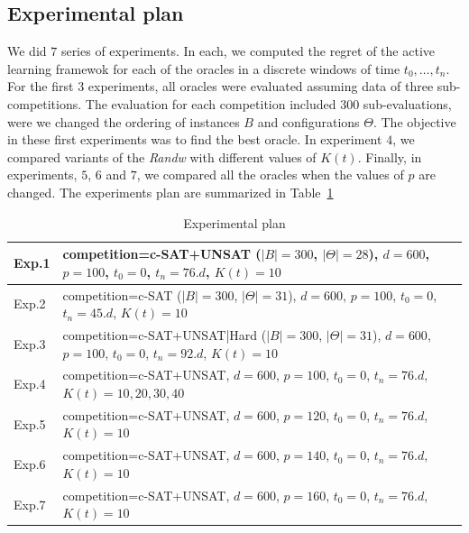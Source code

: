 \documentclass[10pt, conference, compsocconf]{IEEEtran}
\begin{document}
\subsection{Experimental plan}

We did $7$ series of experiments. In each, we computed the regret of the active learning framewok for each
of the oracles in a discrete windows of time $t_0,\dots ,t_n$.
For the first $3$ experiments, all oracles were evaluated assuming data of three sub-competitions. The
evaluation for each competition included $300$ sub-evaluations, were we changed the ordering of instances $B$ and
configurations $\Theta$.  The objective in these first experiments was to find the best oracle. In experiment $4$, we
compared variants of the {\it Randw} with different values of  $K(t)$. Finally, in experiments,
$5$, $6$ and $7$, we compared all the oracles when the values of $p$ are changed. The experiments plan
are summarized in Table~\ref{tab:plan}

\begin{table}
  \begin{center}
  \begin{tabular}{ p{1cm} | p{6cm} }

    {\small Exp.1} & {\small competition=c-SAT+UNSAT ($|B| = 300$, $|\Theta| = 28$), $d=600$, $p=100$, $t_0 = 0$, $t_n = 76.d$, $K(t) = 10$} \\\hline
    {\small Exp.2} & {\small competition=c-SAT ($|B| = 300$, $|\Theta| = 31$), $d=600$, $p=100$, $t_0 = 0$, $t_n = 45.d$, $K(t) = 10$} \\\hline
    {\small Exp.3} & {\small competition=c-SAT+UNSAT|Hard ($|B| = 300$, $|\Theta| = 31$), $d=600$, $p=100$, $t_0 = 0$, $t_n = 92.d$, $K(t) = 10$} \\\hline
    {\small Exp.4} & {\small competition=c-SAT+UNSAT, $d=600$, $p=100$, $t_0 = 0$, $t_n = 76.d$, $K(t) = 10, 20, 30, 40$} \\\hline
    {\small Exp.5} & {\small competition=c-SAT+UNSAT, $d=600$, $p=120$, $t_0 = 0$, $t_n = 76.d$, $K(t) = 10$} \\\hline
    {\small Exp.6} & {\small competition=c-SAT+UNSAT, $d=600$, $p=140$, $t_0 = 0$, $t_n = 76.d$, $K(t) = 10$} \\\hline
    {\small Exp.7} & {\small competition=c-SAT+UNSAT, $d=600$, $p=160$, $t_0 = 0$, $t_n = 76.d$, $K(t) = 10$} \\
  \end{tabular}
  \caption{Experimental plan}
  \label{tab:plan}
  \end{center}
\end{table}
\end{document}
